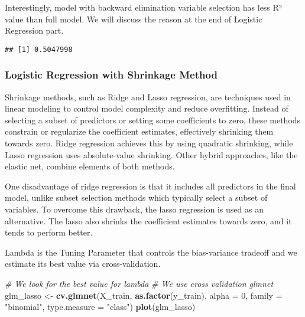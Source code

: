 \documentclass[
]{article}
\newenvironment{Shaded}{\begin{snugshade}}{\end{snugshade}}
\newcommand{\AttributeTok}[1]{\textcolor[rgb]{0.13,0.29,0.53}{#1}}
\newcommand{\CommentTok}[1]{\textcolor[rgb]{0.56,0.35,0.01}{\textit{#1}}}
\newcommand{\DecValTok}[1]{\textcolor[rgb]{0.00,0.00,0.81}{#1}}
\newcommand{\FunctionTok}[1]{\textcolor[rgb]{0.13,0.29,0.53}{\textbf{#1}}}
\newcommand{\NormalTok}[1]{#1}
\newcommand{\OtherTok}[1]{\textcolor[rgb]{0.56,0.35,0.01}{#1}}
\newcommand{\SpecialCharTok}[1]{\textcolor[rgb]{0.81,0.36,0.00}{\textbf{#1}}}
\newcommand{\StringTok}[1]{\textcolor[rgb]{0.31,0.60,0.02}{#1}}
\begin{document}
Interestingly, model with backward elimination variable selection has
less R² value than full model. We will discuss the reason at the end of
Logistic Regression part.

\begin{Shaded}
\end{Shaded}

\begin{verbatim}
## [1] 0.5047998
\end{verbatim}

\hypertarget{logistic-regression-with-shrinkage-method}{%
\subsubsection{Logistic Regression with Shrinkage
Method}\label{logistic-regression-with-shrinkage-method}}

Shrinkage methods, such as Ridge and Lasso regression, are techniques
used in linear modeling to control model complexity and reduce
overfitting. Instead of selecting a subset of predictors or setting some
coefficients to zero, these methods constrain or regularize the
coefficient estimates, effectively shrinking them towards zero. Ridge
regression achieves this by using quadratic shrinking, while Lasso
regression uses absolute-value shrinking. Other hybrid approaches, like
the elastic net, combine elements of both methods.

One disadvantage of ridge regression is that it includes all predictors
in the final model, unlike subset selection methods which typically
select a subset of variables. To overcome this drawback, the lasso
regression is used as an alternative. The lasso also shrinks the
coefficient estimates towards zero, and it tends to perform better.

Lambda is the Tuning Parameter that controls the bias-variance tradeoff
and we estimate its best value via cross-validation.

\begin{Shaded}
\begin{Highlighting}[]
\CommentTok{\# We look for the best value for lambda}
\CommentTok{\# We use cross validation glmnet}
\NormalTok{glm\_lasso }\OtherTok{\textless{}{-}} \FunctionTok{cv.glmnet}\NormalTok{(X\_train, }\FunctionTok{as.factor}\NormalTok{(y\_train),}
                      \AttributeTok{alpha =} \DecValTok{0}\NormalTok{, }\AttributeTok{family =} \StringTok{"binomial"}\NormalTok{, }\AttributeTok{type.measure =} \StringTok{"class"}\NormalTok{)}
\FunctionTok{plot}\NormalTok{(glm\_lasso)}
\end{Highlighting}
\end{Shaded}
\end{document}
